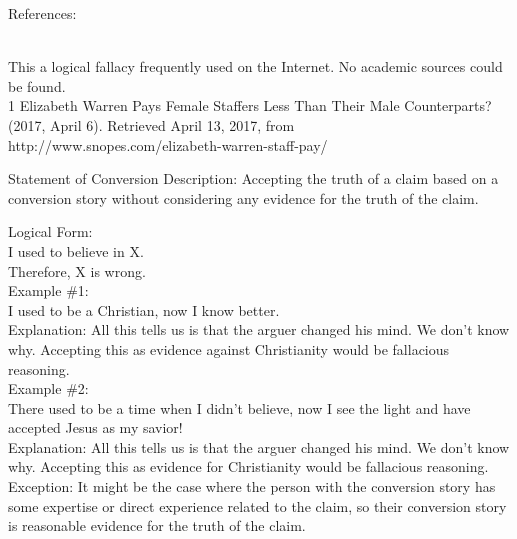 \documentclass[a4paper,12pt,single,pdftex]{scrartcl}
\begin{document}
    References:

    
      
        
      \\

      
        This a logical fallacy frequently used on the Internet. No academic sources could be found.
      \\

      
        
          1 Elizabeth Warren Pays Female Staffers Less Than Their Male Counterparts? (2017, April 6). Retrieved April 13, 2017, from http://www.snopes.com/elizabeth-warren-staff-pay/
        
      
    
  

Statement of Conversion
    Description:  Accepting the truth of a claim based on a conversion story without considering any evidence for the truth of the claim.

    
      Logical Form:
    \\

    
      I used to believe in X.
    \\

    
      Therefore, X is wrong.
    \\

    
      Example \#1:
    \\

    
      I used to be a Christian, now I know better.
    \\

    
      Explanation: All this tells us is that the arguer changed his mind.  We don’t know why. Accepting this as evidence against Christianity would be fallacious reasoning.
    \\

    
      Example \#2:
    \\

    
      There used to be a time when I didn’t believe, now I see the light and have accepted Jesus as my savior!
    \\

    
      Explanation: All this tells us is that the arguer changed his mind.  We don’t know why.  Accepting this as evidence for Christianity would be fallacious reasoning.
    \\

    
      Exception: It might be the case where the person with the conversion story has some expertise or direct experience related to the claim, so their conversion story is reasonable evidence for the truth of the claim. \newline
\end{document}
